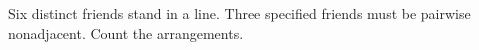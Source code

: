 Six distinct friends stand in a line. Three specified friends must be pairwise nonadjacent. Count the arrangements.

